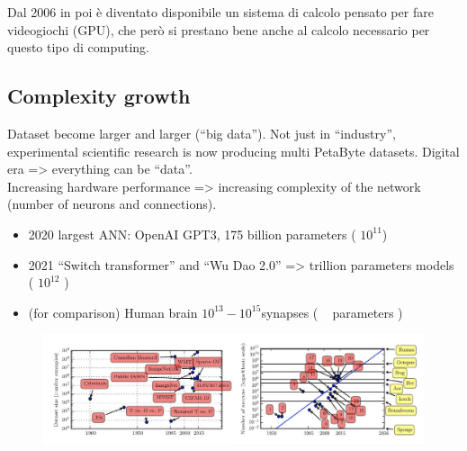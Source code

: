 Dal 2006 in poi è diventato disponibile un sistema di calcolo pensato per fare videogiochi (GPU), che però si prestano bene anche al calcolo necessario per questo tipo di computing.


\subsection{Complexity growth}
Dataset become larger and larger (“big data”). Not just in “industry”, experimental scientific research is now producing multi PetaByte datasets. Digital era => everything can be “data”.\\

Increasing hardware performance => increasing complexity of the network (number of neurons and connections).\\
\begin{itemize}
	\item 2020 largest ANN: OpenAI GPT3, 175 billion parameters ( $10^{11}$)
	\item 2021 “Switch transformer” and “Wu Dao 2.0” => trillion parameters models ( $10^{12}$ )
	\item (for comparison) Human brain $10^{13} - 10^{15} $synapses ( ~ parameters )
\end{itemize}

\begin{figure}[ht]
	\centering
	\includegraphics[width=1\textwidth]{figure_ml/complexity_growth.png}
\end{figure}
\FloatBarrier

